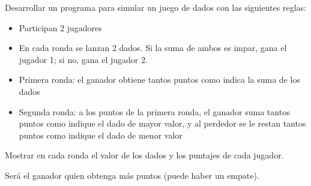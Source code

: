 Desarrollar un programa para simular un juego de dados con las siguientes reglas:

\begin{itemize}
	\item Participan 2 jugadores
	\item En cada ronda se lanzan 2 dados. Si la suma de ambos es impar, gana el jugador 1; si no, gana el jugador 2.
	\item Primera ronda: el ganador obtiene tantos puntos como indica la suma de los dados
	\item Segunda ronda: a los puntos de la primera ronda, el ganador suma tantos puntos como indique el dado de mayor valor, y al perdedor se le restan tantos puntos como indique el dado de menor valor
\end{itemize}

Mostrar en cada ronda el valor de los dados y los puntajes de cada jugador.

Será el ganador quien obtenga más puntos (puede haber un empate).

